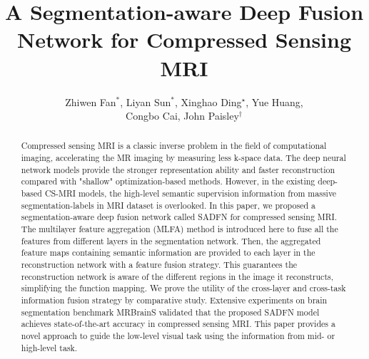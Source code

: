 \documentclass[runningheads]{llncs}
\begin{document}
\pagestyle{headings}
\mainmatter
\def\ECCV18SubNumber{****}  %

\title{A Segmentation-aware Deep Fusion Network for Compressed Sensing MRI} %

%

\author{Zhiwen Fan$^{\ast}$, Liyan Sun$^{\ast}$, Xinghao Ding$^{\star}$, Yue Huang,\\ Congbo Cai, John Paisley$^{\dagger}$\\}



\maketitle

\begin{abstract}
Compressed sensing MRI is a classic inverse problem in the field of computational imaging, accelerating the MR imaging by measuring less k-space data. The deep neural network models provide the stronger representation ability and faster reconstruction compared with "shallow" optimization-based methods. However, in the existing deep-based CS-MRI models, the high-level semantic supervision information from massive segmentation-labels in MRI dataset is overlooked. In this paper, we proposed a segmentation-aware deep fusion network called SADFN for compressed sensing MRI. The multilayer feature aggregation (MLFA) method is introduced here to fuse all the features from different layers in the segmentation network. Then, the aggregated feature maps containing semantic information are provided to each layer in the reconstruction network with a feature fusion strategy. This guarantees the reconstruction network is aware of the different regions in the image it reconstructs, simplifying the function mapping. We prove the utility of the cross-layer and cross-task information fusion strategy by comparative study. Extensive experiments on brain segmentation benchmark MRBrainS validated that the proposed SADFN model achieves state-of-the-art accuracy in compressed sensing MRI. This paper provides a novel approach to guide the low-level visual task using the information from mid- or high-level task.
\end{abstract}
\end{document}
